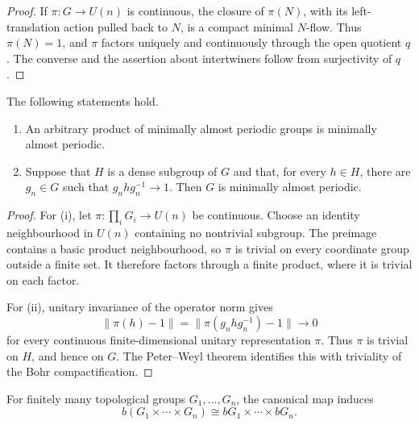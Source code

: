 \begin{proof}
If $\pi:G\to U(n)$ is continuous, the closure of $\pi(N)$, with its
left-translation action pulled back to $N$, is a compact minimal $N$-flow.
Thus $\pi(N)=1$, and $\pi$ factors uniquely and continuously through the
open quotient $q$. The converse and the assertion about intertwiners follow
from surjectivity of $q$.
\end{proof}

\begin{lemma}\label{lem:st-minap-tools}
 The following statements hold.

\begin{enumerate}
\item An arbitrary product of minimally almost periodic groups is minimally
almost periodic.

\item Suppose that $H$ is a dense subgroup of $G$ and that, for every $h\in H
$, there are $g_n\in G$ such that $g_nhg_n^{-1}\to1$. Then $G$ is minimally
almost periodic.
\end{enumerate}
\end{lemma}

\begin{proof}
For (i), let $\pi:\prod_iG_i\to U(n)$ be continuous. Choose an identity
neighbourhood in $U(n)$ containing no nontrivial subgroup. The preimage
contains a basic product neighbourhood, so $\pi$ is trivial on every
coordinate group outside a finite set. It therefore factors through a finite
product, where it is trivial on each factor.

For (ii), unitary invariance of the operator norm gives 
\begin{equation*}
\|\pi(h)-1\|=\|\pi(g_nhg_n^{-1})-1\|\longrightarrow0 
\end{equation*}
for every continuous finite-dimensional unitary representation $\pi$. Thus $\pi$ is trivial on $H$, and hence on $G$. The Peter--Weyl theorem identifies
this with triviality of the Bohr compactification.
\end{proof}

\begin{lemma}\label{lem:st-bohr-finite-products}
 For finitely many topological groups $G_1,\ldots,G_n$, the canonical map induces 
\begin{equation*}
b(G_1\times\cdots\times G_n)\cong bG_1\times\cdots\times bG_n. 
\end{equation*}
\end{lemma}

